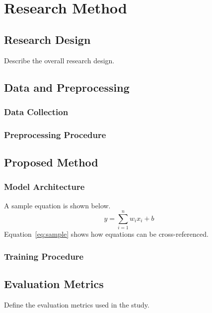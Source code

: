\chapter{Research Method}
\label{ch:method}

\section{Research Design}

Describe the overall research design.

\section{Data and Preprocessing}

\subsection{Data Collection}

\subsection{Preprocessing Procedure}

\section{Proposed Method}

\subsection{Model Architecture}

A sample equation is shown below.
\begin{equation}
  \label{eq:sample}
  y = \sum_{i=1}^{n} w_i x_i + b
\end{equation}
Equation~\eqref{eq:sample} shows how equations can be cross-referenced.

\subsection{Training Procedure}

\section{Evaluation Metrics}

Define the evaluation metrics used in the study.
